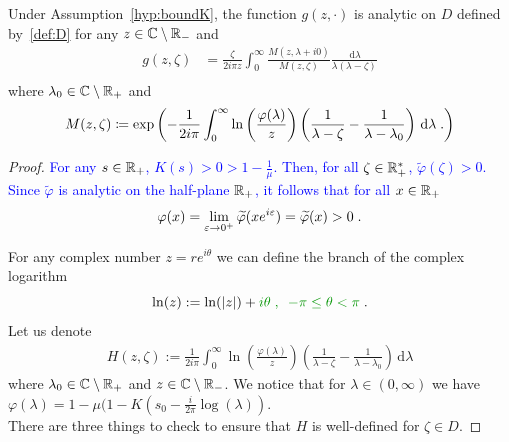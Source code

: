 \documentclass[11pt]{amsart}
\newcommand{\MD}{\color{vert}}
\newcommand{\f}{\frac}
\newcommand{\blue}[1]{\textcolor{blue}{#1}}
\newcommand{\diff}{\,\mathrm{d}}
\begin{document}
\begin{theorem}
Under Assumption~\ref{hyp:boundK}, the function $g(z, \cdot)$ is analytic on $D$ defined by~\eqref{def:D} for any $z \in \mathbb{C} \setminus \mathbb{R}_-$ and
\begin{align*}
    g(z,\zeta) 
    &= 
    \frac{\zeta}{2i\pi z}\int_0^\infty  \frac{M(z,\lambda+i0)}{M(z,\zeta)} \frac{\diff \lambda}{\lambda(\lambda-\zeta)} \\
\end{align*}
where $\lambda_0 \in \mathbb{C} \setminus \mathbb{R}_+$ and 
$$ M(z, \zeta) \coloneqq \exp\left(-{\frac{1}{2i\pi  }\int_0^\infty \ln\left(\frac{\varphi(\lambda)}{z}\right) \left( \frac{1}{\lambda-\zeta} - \frac{1}{\lambda-\lambda_0}\right) \diff \lambda} \eqfinp\right)$$ 
\end{theorem}
\begin{proof}
\blue{For any $s \in \mathbb{R}_+$, $K(s) > 0 > 1 - \frac1\mu$. Then, 
for all $\zeta \in \mathbb{R}_+^*$, $\tilde \varphi(\zeta) > 0$.
Since $\tilde \varphi$ is analytic on the half-plane $\mathbb{R}_+$, it follows that for all $x \in \mathbb{R}_+$ 
    $$\varphi(x) = \lim_{\varepsilon \to 0^+} \widetilde \varphi(xe^{i\varepsilon}) = \widetilde \varphi(x) > 0 \; .$$
}

For any complex number $z = re^{i\theta}$ we can define the branch of the complex logarithm
\begin{equation}\label{def:log}
\ln(z) := \ln(|z|) +{\MD i\theta \eqsepv -\pi \leq \theta < \pi } \eqfinp
\end{equation}
Let us denote
    \begin{align}\label{def:H}
        H(z,\zeta) := \frac{1}{2i\pi }\int_0^\infty \ln\left(\frac{\varphi(\lambda)}{z}\right) \left( \frac{1}{\lambda-\zeta} - \frac{1}{\lambda-\lambda_0}\right) \diff \lambda
    \end{align}
where $\lambda_0 \in \mathbb{C} \setminus \mathbb{R}_+$ and \blue{$z \in \mathbb{C} \setminus \mathbb{R}_-$}. We notice that for $\lambda \in (0,\infty)$ we have $\varphi(\lambda)=1-\mu(1-K(s_0-\f{i}{2\pi} \log(\lambda))$.\\

There are three things to check to ensure that $H$ is well-defined for $\zeta \in D$. 


\end{proof}
\end{document}
